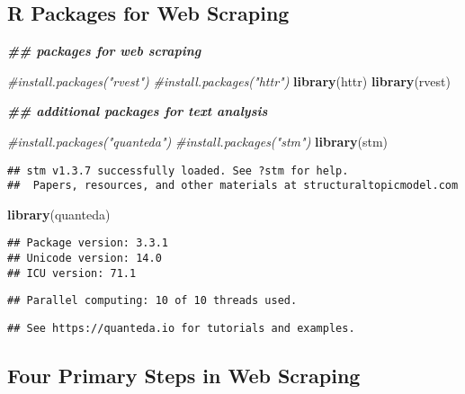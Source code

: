 \documentclass[
]{article}
\newenvironment{Shaded}{\begin{snugshade}}{\end{snugshade}}
\newcommand{\CommentTok}[1]{\textcolor[rgb]{0.56,0.35,0.01}{\textit{#1}}}
\newcommand{\DocumentationTok}[1]{\textcolor[rgb]{0.56,0.35,0.01}{\textbf{\textit{#1}}}}
\newcommand{\FunctionTok}[1]{\textcolor[rgb]{0.13,0.29,0.53}{\textbf{#1}}}
\newcommand{\NormalTok}[1]{#1}
\begin{document}
\hypertarget{r-packages-for-web-scraping}{%
\subsection{R Packages for Web
Scraping}\label{r-packages-for-web-scraping}}

\begin{Shaded}
\begin{Highlighting}[]
\DocumentationTok{\#\# packages for web scraping }

\CommentTok{\#install.packages("rvest")}
\CommentTok{\#install.packages("httr")}
\FunctionTok{library}\NormalTok{(httr)}
\FunctionTok{library}\NormalTok{(rvest)}



\DocumentationTok{\#\# additional packages for text analysis }

\CommentTok{\#install.packages("quanteda")}
\CommentTok{\#install.packages("stm")}
\FunctionTok{library}\NormalTok{(stm)}
\end{Highlighting}
\end{Shaded}

\begin{verbatim}
## stm v1.3.7 successfully loaded. See ?stm for help. 
##  Papers, resources, and other materials at structuraltopicmodel.com
\end{verbatim}

\begin{Shaded}
\begin{Highlighting}[]
\FunctionTok{library}\NormalTok{(quanteda)}
\end{Highlighting}
\end{Shaded}

\begin{verbatim}
## Package version: 3.3.1
## Unicode version: 14.0
## ICU version: 71.1
\end{verbatim}

\begin{verbatim}
## Parallel computing: 10 of 10 threads used.
\end{verbatim}

\begin{verbatim}
## See https://quanteda.io for tutorials and examples.
\end{verbatim}

\hypertarget{four-primary-steps-in-web-scraping}{%
\subsection{Four Primary Steps in Web
Scraping}\label{four-primary-steps-in-web-scraping}}
\end{document}
